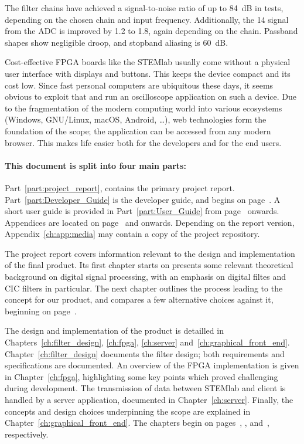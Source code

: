 The filter chains have achieved a  signal-to-noise ratio of up to \SI{84}{\dB}
in tests,  depending on  the chosen  chain and  input frequency. Additionally,
the  \SI{14}{\bit}  signal from  the  ADC  is  improved by  \SI{1.2}{\bit}  to
\SI{1.8}{\bit}, again depending on  the chain. Passband shapes show negligible
droop, and stopband aliasing is \SI{60}{\dB}.

Cost-effective FPGA  boards like the  STEMlab usually come without  a physical
user interface  with displays and  buttons. This keeps the device  compact and
its cost  low.  Since fast  personal computers  are ubiquitous these  days, it
seems obvious  to exploit that and  run an oscilloscope application  on such a
device. Due to  the fragmentation of  the modern computing world  into various
ecosystems (Windows, GNU/Linux, macOS, Android, \ldots), web technologies form
the foundation of  the scope; the application can be  accessed from any modern
browser. This makes life easier both for the developers and for the end users.

\paragraph{This      document      is      split      into      four      main
parts:} Part~\ref{part:project_report},    contains   the    primary   project
report. Part~\ref{part:Developer_Guide}   is   the    developer   guide,   and
begins   on  page~\pageref{part:Developer_Guide}. A   short   user  guide   is
provided  in  Part~\ref{part:User_Guide}  from  page~\pageref{part:User_Guide}
onwards. Appendices   are   located   on   page~\pageref{ch:app:fdesign}   and
onwards. Depending  on  the  report version,  Appendix~\ref{ch:app:media}  may
contain a copy of the project repository.

The   project  report   covers  information   relevant  to   the  design   and
implementation of the final product. Its first chapter starts on presents some
relevant theoretical background on digital signal processing, with an emphasis
on digital  filtes  and CIC  filters in particular. The next  chapter outlines
the  process leading  to  the concept  for  our product,  and  compares a  few
alternative choices against it, beginning on page~\pageref{ch:mission}.

The    design   and    implementation    of   the    product   is    detailled
in     Chapters~\ref{ch:filter_design},     \ref{ch:fpga},     \ref{ch:server}
and~\ref{ch:graphical_front_end}. Chapter~\ref{ch:filter_design} documents the
filter  design;  both  requirements   and  specifications  are  documented. An
overview  of  the  FPGA  implementation  is  given  in  Chapter~\ref{ch:fpga},
highlighting some key points  which proved challenging during development. The
transmission   of   data   between   STEMlab  and   client   is   handled   by
a   server   application,  documented   in   Chapter~\ref{ch:server}. Finally,
the    concepts   and    design   choices    underpinning   the    scope   are
explained   in    Chapter~\ref{ch:graphical_front_end}. The   chapters   begin
on  pages~\pageref{ch:filter_design},  \pageref{ch:fpga},  \pageref{ch:server}
and~\pageref{ch:graphical_front_end}, respectively.

